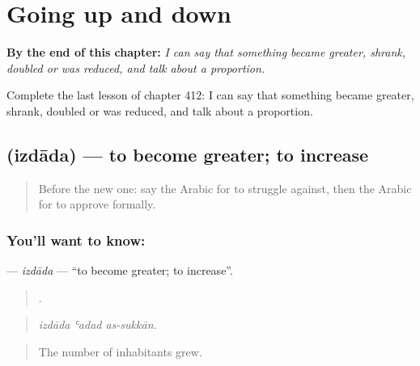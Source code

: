 
\chapter{Going up and down}
\label{ch:ar-going-up-and-down}

\begin{chapteropening}
\textbf{By the end of this chapter:} \emph{I can say that something became greater, shrank, doubled or was reduced, and talk about a proportion.}

Complete the last lesson of chapter 412: I can say that something became greater, shrank, doubled or was reduced, and talk about a proportion.
\end{chapteropening}

\section[\texorpdfstring{\ar{ازداد} (izdāda)}{ازداد (izdāda)}]{ (izdāda) — to become greater; to increase}

\label{lesson:AR-C412-izdada}



\begin{quote}
Before the new one: say the Arabic for to struggle against, then the Arabic for to approve formally.
\end{quote}

\subsection*{You'll want to know: }
\textbf{} — \emph{izdāda} — \textquotedblleft{}to become greater; to increase\textquotedblright{}.

\begin{quote}
  .
\end{quote}

\begin{quote}
\emph{izdāda ʿadad as-sukkān.}
\end{quote}

\begin{quote}
The number of inhabitants grew.
\end{quote}

